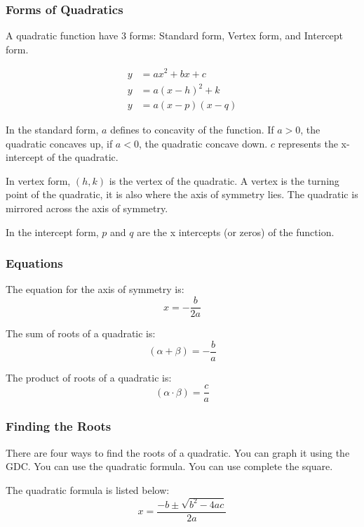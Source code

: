 \documentclass[../notes.tex]{subfiles}
\begin{document}
\subsubsection{Forms of Quadratics}
A quadratic function have 3 forms: Standard form, Vertex form, and Intercept form.

\begin{align}
	y &= ax^2 + bx + c \\
	y &= a(x-h)^2 + k \\
	y &= a(x-p)(x-q) 
\end{align} 

In the standard form, $a$ defines to concavity of the function.
If $a>0$, the quadratic concaves up, if $a<0$, the quadratic concave down.
$c$ represents the x-intercept of the quadratic.

In vertex form, $(h,k)$ is the vertex of the quadratic.
A vertex is the turning point of the quadratic, it is also where the axis of symmetry lies.
The quadratic is mirrored across the axis of symmetry.

In the intercept form, $p$ and $q$ are the x intercepts (or zeros) of the function.

\subsubsection{Equations}
The equation for the axis of symmetry is:
\begin{equation}
	x = -\frac{b}{2a}
\end{equation}

The sum of roots of a quadratic is:
\begin{equation}
	(\alpha+\beta) = -\frac{b}{a}
\end{equation}

The product of roots of a quadratic is:
\begin{equation}
	(\alpha \cdot \beta) = \frac{c}{a}
\end{equation}

\subsubsection{Finding the Roots}
There are four ways to find the roots of a quadratic.
You can graph it using the GDC.
You can use the quadratic formula.
You can use complete the square.

The quadratic formula is listed below:
\begin{equation}
	x = \frac{-b \pm \sqrt{b^2-4ac}}{2a}
\end{equation}
\end{document}
